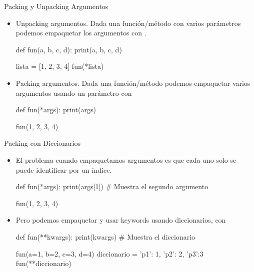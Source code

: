 \documentclass[10pt,envcountsect,spanish]{beamer}
\begin{document}
\begin{frame}[fragile]{Packing y Unpacking Argumentos}

\begin{itemize}
\item Unpacking argumentos. Dada una función/método con varios parámetros podemos empaquetar los argumentos con \cm{*}.

\begin{pyconsole}[][frame=single]
def fun(a, b, c, d): 
    print(a, b, c, d)

lista = [1, 2, 3, 4]
fun(*lista)
\end{pyconsole}

\item Packing argumentos. Dada una función/método podemos empaquetar varios argumentos usando un parámetro con \cm{*}
\begin{pyconsole}[][frame=single]
def fun(*args): 
    print(args)

fun(1, 2, 3, 4)
\end{pyconsole}
\end{itemize}
\end{frame}




\begin{frame}[fragile]{Packing con Diccionarios}

\begin{itemize}
\item El problema cuando empaquetamos argumentos es que cada uno solo se puede identificar por un índice.

\begin{pyconsole}[][frame=single]
def fun(*args): 
    print(args[1]) # Muestra el segundo argumento

fun(1, 2, 3, 4)
\end{pyconsole}

\item Pero podemos empaquetar y usar keywords usando diccionarios, con \cm{**}
\begin{pyconsole}[][frame=single]
def fun(**kwargs): 
    print(kwargs) # Muestra el diccionario

fun(a=1, b=2, c=3, d=4)
diccionario = {'p1': 1, 'p2': 2, 'p3':3}
fun(**diccionario)
\end{pyconsole}

\end{itemize}
\end{frame}
\end{document}
